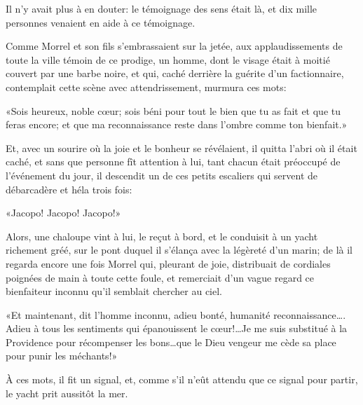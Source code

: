 Il n'y avait plus à en douter: le témoignage des sens était là, et dix mille personnes venaient en aide à ce témoignage.

Comme Morrel et son fils s'embrassaient sur la jetée, aux applaudissements de toute la ville témoin de ce prodige, un homme, dont le visage était à moitié couvert par une barbe noire, et qui, caché derrière la guérite d'un factionnaire, contemplait cette scène avec attendrissement, murmura ces mots:

«Sois heureux, noble cœur; sois béni pour tout le bien que tu as fait et que tu feras encore; et que ma reconnaissance reste dans l'ombre comme ton bienfait.»

Et, avec un sourire où la joie et le bonheur se révélaient, il quitta l'abri où il était caché, et sans que personne fît attention à lui, tant chacun était préoccupé de l'événement du jour, il descendit un de ces petits escaliers qui servent de débarcadère et héla trois fois:

«Jacopo! Jacopo! Jacopo!»

Alors, une chaloupe vint à lui, le reçut à bord, et le conduisit à un yacht richement gréé, sur le pont duquel il s'élança avec la légèreté d'un marin; de là il regarda encore une fois Morrel qui, pleurant de joie, distribuait de cordiales poignées de main à toute cette foule, et remerciait d'un vague regard ce bienfaiteur inconnu qu'il semblait chercher au ciel.

«Et maintenant, dit l'homme inconnu, adieu bonté, humanité reconnaissance\dots. Adieu à tous les sentiments qui épanouissent le cœur!\dots Je me suis substitué à la Providence pour récompenser les bons\dots que le Dieu vengeur me cède sa place pour punir les méchants!»

À ces mots, il fit un signal, et, comme s'il n'eût attendu que ce signal pour partir, le yacht prit aussitôt la mer.



